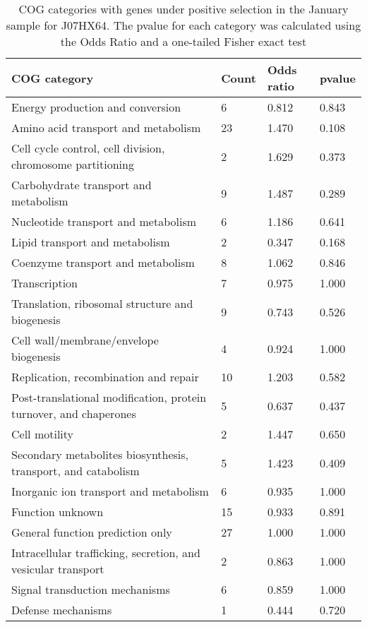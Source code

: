 \begin{table}[]
\footnotesize 
	\tabcolsep=0.11cm 
\caption{COG categories with genes under positive selection in the January sample for J07HX64. The pvalue for each category was calculated using the Odds Ratio and a one-tailed Fisher exact test} 
\begin{tabularx}{\textwidth}{L{6cm}R{2cm}R{2cm}R{2cm}} 
\hline 
\textbf{COG category} & \textbf{Count} & \textbf{Odds ratio} & \textbf{pvalue} \\ 
\hline 
Energy production and conversion & 6 & 0.812 & 0.843 \\ 
Amino acid transport and metabolism & 23 & 1.470 & 0.108 \\ 
Cell cycle control, cell division, chromosome partitioning & 2 & 1.629 & 0.373 \\ 
Carbohydrate transport and metabolism & 9 & 1.487 & 0.289 \\ 
Nucleotide transport and metabolism & 6 & 1.186 & 0.641 \\ 
Lipid transport and metabolism & 2 & 0.347 & 0.168 \\ 
Coenzyme transport and metabolism & 8 & 1.062 & 0.846 \\ 
Transcription & 7 & 0.975 & 1.000 \\ 
Translation, ribosomal structure and biogenesis & 9 & 0.743 & 0.526 \\ 
Cell wall/membrane/envelope biogenesis & 4 & 0.924 & 1.000 \\ 
Replication, recombination and repair & 10 & 1.203 & 0.582 \\ 
Post-translational modification, protein turnover, and chaperones & 5 & 0.637 & 0.437 \\ 
Cell motility & 2 & 1.447 & 0.650 \\ 
Secondary metabolites biosynthesis, transport, and catabolism & 5 & 1.423 & 0.409 \\ 
Inorganic ion transport and metabolism & 6 & 0.935 & 1.000 \\ 
Function unknown & 15 & 0.933 & 0.891 \\ 
General function prediction only & 27 & 1.000 & 1.000 \\ 
Intracellular trafficking, secretion, and vesicular transport & 2 & 0.863 & 1.000 \\ 
Signal transduction mechanisms & 6 & 0.859 & 1.000 \\ 
Defense mechanisms & 1 & 0.444 & 0.720 \\ 
\end{tabularx} 
\label{January_COG_Selection_J07HX64} 
 \end{table} 


